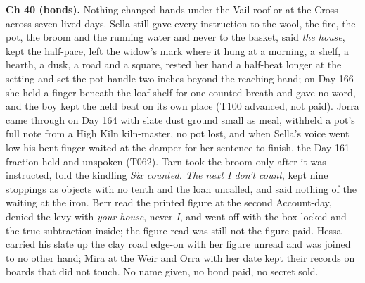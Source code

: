 \documentclass{design/chronicle}
\begin{document}
{\textbf{Ch 40 (bonds).} Nothing changed hands under the Vail roof or at the Cross across seven lived days. Sella still gave every instruction to the wool, the fire, the pot, the broom and the running water and never to the basket, said \emph{the house}, kept the half-pace, left the widow’s mark where it hung at a morning, a shelf, a hearth, a dusk, a road and a square, rested her hand a half-beat longer at the setting and set the pot handle two inches beyond the reaching hand; on Day 166 she held a finger beneath the loaf shelf for one counted breath and gave no word, and the boy kept the held beat on its own place (T100 advanced, not paid). Jorra came through on Day 164 with slate dust ground small as meal, withheld a pot’s full note from a High Kiln kiln-master, no pot lost, and when Sella’s voice went low his bent finger waited at the damper for her sentence to finish, the Day 161 fraction held and unspoken (T062). Tarn took the broom only after it was instructed, told the kindling \emph{Six counted. The next I don’t count}, kept nine stoppings as objects with no tenth and the loan uncalled, and said nothing of the waiting at the iron. Berr read the printed figure at the second Account-day, denied the levy with \emph{your house}, never \emph{I}, and went off with the box locked and the true subtraction inside; the figure read was still not the figure paid. Hessa carried his slate up the clay road edge-on with her figure unread and was joined to no other hand; Mira at the Weir and Orra with her date kept their records on boards that did not touch. No name given, no bond paid, no secret sold.

}
\end{document}
